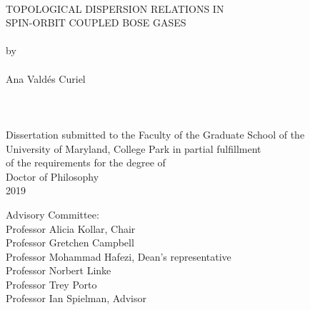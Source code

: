 
\thispagestyle{empty}
\hbox{\ }
\vspace{1in}
\renewcommand{\baselinestretch}{1}
\small\normalsize
\begin{center}

\large{{TOPOLOGICAL DISPERSION RELATIONS IN}} \\
\large{{SPIN-ORBIT COUPLED BOSE GASES}}
\ \\
\ \\
\large{by} \\
\ \\
\large{Ana Vald\'es Curiel}%
\ \\
\ \\
\ \\
\ \\
\normalsize
Dissertation submitted to the Faculty of the Graduate School of the \\
University of Maryland, College Park in partial fulfillment \\
of the requirements for the degree of \\
Doctor of Philosophy \\
2019
\end{center}

\vspace{7.5em}

\noindent Advisory Committee: \\
Professor Alicia Kollar, Chair \\
Professor Gretchen Campbell \\
Professor Mohammad Hafezi, Dean's representative \\
Professor Norbert Linke  \\
Professor Trey Porto \\
Professor Ian Spielman, Advisor \\






